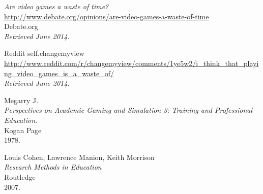 \begin{thebibliography}{99}
  \emph{Are video games a waste of time?} \\
  \url{http://www.debate.org/opinions/are-video-games-a-waste-of-time} \\
  Debate.org \\
  \emph{Retrieved June 2014}.

  Reddit self.changemyview \\
  \url{http://www.reddit.com/r/changemyview/comments/1ye5w2/i_think_that_playing_video_games_is_a_waste_of/} \\
  \emph{Retrieved June 2014}.

  Megarry J. \\
  \emph{Perspectives on Academic Gaming and Simulation 3: Training and Professional Education.} \\
  Kogan Page \\
  1978.

  Louis Cohen, Lawrence Manion, Keith Morrison \\
  \emph{Research Methods in Education} \\
  Routledge \\
  2007.

\end{thebibliography}
